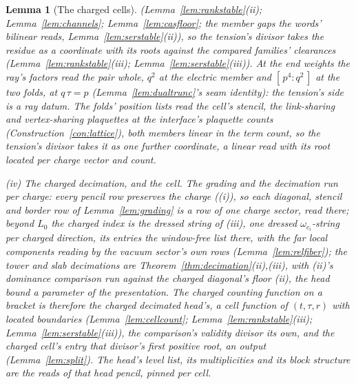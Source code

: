 \documentclass[11pt]{article}
\newtheorem{lemma}{Lemma}
\theoremstyle{definition}
\begin{document}
\begin{lemma}[The charged cells]
(Lemma~\ref{lem:rankstable}(ii); Lemma~\ref{lem:channels};
Lemma~\ref{lem:casfloor}; the member gaps the words' bilinear
reads, Lemma~\ref{lem:serstable}(ii)), so the tension's divisor
takes the
residue as a coordinate with its roots against the compared
families' clearances (Lemma~\ref{lem:rankstable}(iii);
Lemma~\ref{lem:serstable}(iii)). At the end
weights the ray's factors read the pair whole, $q^2$ at the
electric member and $[\,p^4:q^2\,]$ at the two folds, at
$q\,\tau=p$ (Lemma~\ref{lem:dualtrunc}'s seam identity): the
tension's side is a ray datum. The folds' position lists read the
cell's stencil, the link-sharing and vertex-sharing plaquettes at
the interface's plaquette counts
(Construction~\ref{con:lattice}), both members linear in the term
count, so the tension's divisor takes it as one further
coordinate, a linear read with its root located per charge vector
and count.

\emph{(iv) The charged decimation, and the cell.} The grading and the decimation
run per charge: every pencil row preserves the charge ((i)), so each
diagonal, stencil and border row of Lemma~\ref{lem:grading} is a row of
one charge sector, read there; beyond $L_0$ the charged index is the
dressed string of (iii), one dressed $\omega_{c_i}$-string per charged
direction, its entries the window-free list there, with
the far local components reading by the vacuum sector's own rows
(Lemma~\ref{lem:relfiber}); the tower and slab decimations are
Theorem~\ref{thm:decimation}(ii),(iii), with (ii)'s dominance comparison run
against the charged diagonal's floor (ii), the head bound a parameter of
the presentation. The charged counting function on a bracket is
therefore the charged decimated head's, a cell function of $(t,\tau,r)$
with located boundaries (Lemma~\ref{lem:cellcount};
Lemma~\ref{lem:rankstable}(iii);
Lemma~\ref{lem:serstable}(iii)), the comparison's validity divisor its
own, and the \emph{charged cell}'s entry that divisor's first positive
root, an output (Lemma~\ref{lem:split}). The head's level list,
its multiplicities and its block structure are the reads of that head
pencil, pinned per cell.

\end{lemma}
\end{document}
